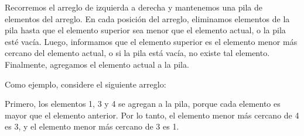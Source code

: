 Recorremos el arreglo de izquierda a derecha
y mantenemos una pila de elementos del arreglo.
En cada posición del arreglo, eliminamos elementos de la pila
hasta que el elemento superior sea menor que el
elemento actual, o la pila esté vacía.
Luego, informamos que el elemento superior es
el elemento menor más cercano del elemento actual,
o si la pila está vacía, no existe tal elemento.
Finalmente, agregamos el elemento actual a la pila.

Como ejemplo, considere el siguiente arreglo:
\begin{center}
\end{center}

Primero, los elementos 1, 3 y 4 se agregan a la pila,
porque cada elemento es mayor que el elemento anterior.
Por lo tanto, el elemento menor más cercano de 4 es 3,
y el elemento menor más cercano de 3 es 1.
\begin{center}
\end{center}

